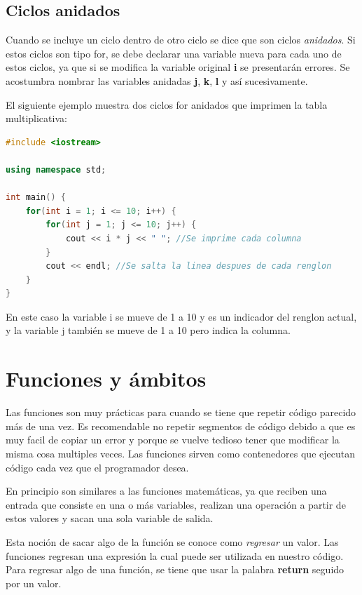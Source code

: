 \documentclass{article}
\begin{document}
\subsection{Ciclos anidados}

Cuando se incluye un ciclo dentro de otro ciclo se dice que son ciclos \textit{anidados}. Si estos ciclos son tipo for, se debe declarar una variable nueva para cada uno de estos ciclos, ya que si se modifica la variable original \textbf{i} se presentarán errores. Se acostumbra nombrar las variables anidadas \textbf{j}, \textbf{k}, \textbf{l} y así sucesivamente.

El siguiente ejemplo muestra dos ciclos for anidados que imprimen la tabla multiplicativa:

\begin{lstlisting}[language=C++, title=Tabla multiplicativa]
#include <iostream>

using namespace std;

int main() {
	for(int i = 1; i <= 10; i++) {
		for(int j = 1; j <= 10; j++) {
			cout << i * j << " "; //Se imprime cada columna
		}
		cout << endl; //Se salta la linea despues de cada renglon
	}
}
\end{lstlisting}

En este caso la variable i se mueve de 1 a 10 y es un indicador del renglon actual, y la variable j también se mueve de 1 a 10 pero indica la columna.

\section{Funciones y ámbitos}

Las funciones son muy prácticas para cuando se tiene que repetir código parecido más de una vez. Es recomendable no repetir segmentos de código debido a que es muy facil de copiar un error y porque se vuelve tedioso tener que modificar la misma cosa multiples veces. Las funciones sirven como contenedores que ejecutan código cada vez que el programador desea.

En principio son similares a las funciones matemáticas, ya que reciben una entrada que consiste en una o más variables, realizan una operación a partir de estos valores y sacan una sola variable de salida.

Esta noción de sacar algo de la función se conoce como \textit{regresar} un valor. Las funciones regresan una expresión la cual puede ser utilizada en nuestro código. Para regresar algo de una función, se tiene que usar la palabra \textbf{return} seguido por un valor.
\end{document}
